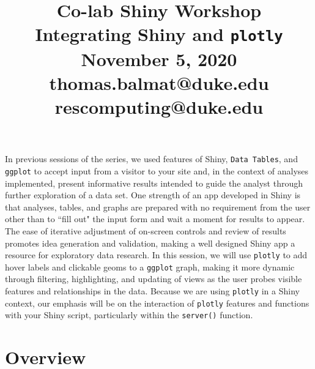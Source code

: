 \documentclass[10pt, letterpaper]{article}
\title{\Large Co-lab Shiny Workshop\\[6pt]
       \large Integrating Shiny and \texttt{plotly}\\[6pt]
       November 5, 2020\\[20pt]
       \normalsize thomas.balmat@duke.edu\\[1pt]rescomputing@duke.edu}
\date{}
\begin{document}
    
\begin{spacing}{1.0}
    
\maketitle

\vspace{-20pt}


In previous sessions of the series, we used features of Shiny, \texttt{Data Tables}, and \texttt{ggplot} to accept input from a visitor to your site and, in the context of analyses implemented, present informative results intended to guide the analyst through further exploration of a data set.  One strength of an app developed in  Shiny is that analyses, tables, and graphs are prepared with no requirement from the user other than to ``fill out" the input form and wait a moment for results to appear.  The ease of iterative adjustment of on-screen controls and review of results promotes idea generation and validation, making a well designed Shiny app a resource for exploratory data research.  In this session, we will use \texttt{plotly} to add hover labels and clickable geoms to a \texttt{ggplot} graph, making it more dynamic through filtering, highlighting, and updating of views as the user probes visible features and relationships in the data.  Because we are using \texttt{plotly} in a Shiny context, our emphasis will be on the interaction of \texttt{plotly} features and functions with your Shiny script, particularly within the \texttt{server()} function.



\section{Overview}


\end{spacing}
\end{document}
